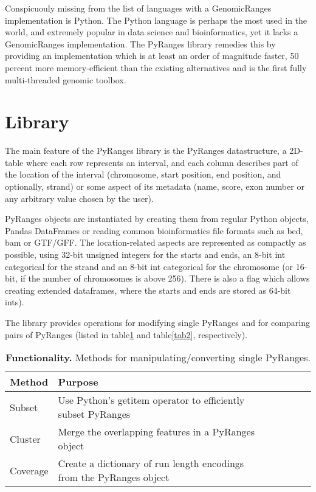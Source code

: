 \documentclass[10pt,letterpaper]{article}
\begin{document}
Conspicuouly missing from the list of languages with a GenomicRanges
implementation is Python. The Python language is perhaps the most used in the
world, and extremely popular in data science and bioinformatics, yet it lacks a
GenomicRanges implementation. The PyRanges library remedies this by providing an
implementation which is at least an order of magnitude faster, 50 percent more
memory-efficient than the existing alternatives and is the first fully
multi-threaded genomic toolbox.

\section*{Library}

The main feature of the PyRanges library is the PyRanges datastructure, a
2D-table where each row represents an interval, and each column describes part
of the location of the interval (chromosome, start position, end position, and
optionally, strand) or some aspect of its metadata (name, score, exon number or
any arbitrary value chosen by the user).

PyRanges objects are instantiated by creating them from regular Python objects,
Pandas DataFrames or reading common bioinformatics file formats such as bed, bam
or GTF/GFF. The location-related aspects are represented as compactly as
possible, using 32-bit unsigned integers for the starts and ends, an 8-bit
int categorical for the strand and an 8-bit int categorical for the chromosome
(or 16-bit, if the number of chromosomes is above 256). There is also a flag
which allows creating extended dataframes, where the starts and ends are stored
as 64-bit ints).

The library provides operations for modifying single PyRanges and for comparing
pairs of PyRanges (listed in table\ref{tab1} and table\ref{tab2}, respectively).

\begin{table}[!ht]
\begin{adjustwidth}{-1.5in}{0in}
\centering
\caption{{\bf Functionality.} Methods for manipulating/converting single PyRanges.}
\begin{tabular}{|l|l|l|l|l|l|l|}
\hline
  {\bf Method} & {\bf Purpose} \\ \hline
  Subset & Use Python's getitem operator to efficiently subset PyRanges \\ \hline
  Cluster & Merge the overlapping features in a PyRanges object \\ \hline
  Coverage & Create a dictionary of run length encodings from the PyRanges object \\ \hline
\end{tabular}
\label{tab1}
\end{adjustwidth}
\end{table}
\end{document}
